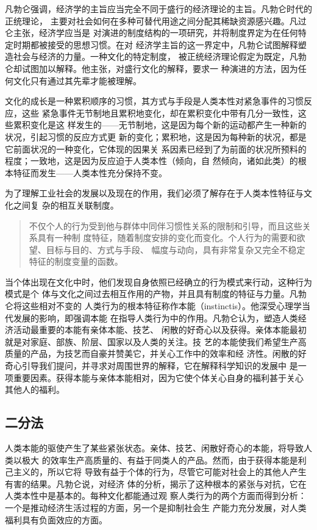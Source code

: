 凡勃仑强调，经济学的主旨应当完全不同于盛行的经济理论的主旨。凡勃仑时代的正统理论，
主要对社会如何在多种可替代用途之间分配其稀缺资源感兴趣。凡过仑主张，经济学应当是
对演进的制度结构的一项研究，并将制度界定为在任何特定时期都被接受的思想习惯。在对
经济学主旨的这一界定中，凡勃仑试图解释塑造社会与经济的力量。一种文化的特定制度，
被正统经济理论假定为既定，凡勃仑却试图加以解释。他主张，对盛行文化的解释，要求一
种演进的方法，因为任何文化只有通过其先辈才能被理解。

文化的成长是一种累积顺序的习惯，其方式与手段是人类本性对紧急事件的习惯反应，这些
紧急事件无节制地且累积地变化，却在累积变化中带有几分一致性，这些累积变化是这
样发生的——无节制地，这是因为每个新的运动都产生一种新的状况，引起习惯的反应方式更
新的变化；累积地，这是因为每种新的状况，都是它前面状况的一种变化，它体现的因果关
系因素已经到了为前面的状况所预料的程度；一致地，这是因为反应迫于人类本性（倾向，自
然倾向，诸如此类）的根本特征而发生——人类本性充分保持不变。

为了理解工业社会的发展以及现在的作用，我们必须了解存在于人类本性特征与文化之间复
杂的相互关联制度。
\begin{quotation}
  不仅个人的行为受到他与群体中同伴习惯性关系的限制和引导，而且这些关系具有一种制
  度特征，随着制度安排的变化而变化。个人行为的需要和欲望、目标与目的、方式与手段、
  幅度与动向，具有非常复杂又完全不稳定特征的制度变量的函数。
\end{quotation}

当个体出现在文化中时，他们发现自身依照已经确立的行为模式来行动，这种行为模式是个
体与文化之间过去相互作用的产物，并且具有制度的特征与力量。凡勃仑将这些相对不变的
人类行为的根本特征称作本能（instinctis）。他深受心理学当代发展的影响，即强调本能
在指导人类行为中的作用。凡勃仑认为，塑造人类经济活动最重要的本能有亲体本能、技艺、
闲散的好奇心以及获得。亲体本能最初就是对家庭、部族、阶层、国家以及人类的关注。技
艺的本能使我们希望生产高质量的产品，为技艺而自豪并赞美它，并关心工作中的效率和经
济性。闲散的好奇心引导我们提问，并寻求对周围世界的解释，它在解释科学知识的发展中
是一项重要因素。获得本能与亲体本能相对，因为它使个体关心自身的福利甚于关心
其他人的福利。

\subsection{二分法}

人类本能的驱使产生了某些紧张状态。亲体、技艺、闲散好奇心的本能，将导致人类以极大
的效率生产高质量的、有益于同类人的产品。然而，由于获得本能是利己主义的，所以它将
导致有益于个体的行为，尽管它可能对社会上的其他人产生有害的结果。凡勃仑说，对经济
体的分析，揭示了这种根本的紧张与对抗，它在人类本性中是基本的。每种文化都能通过观
察人类行为的两个方面而得到分析：一个是推动经济生活过程的方面，另一个是抑制社会生
产能力充分发展，对人类福利具有负面效应的方面。

